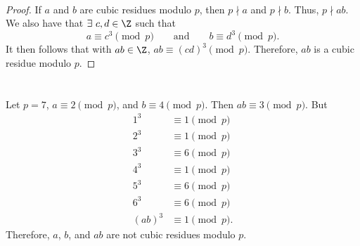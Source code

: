 \documentclass[
  coursecode={MTHE 418},
  assignmentname={Homework \homeworknumber},
  studentnumber=20053722,
  name={Bryan Hoang},z
  draft,
]{
  ltxanswer%
}
\begin{document}
  \begin{questions}
    \setcounter{question}{\questionnumber}
    \addtocounter{question}{-1}
    \question[10]\
    \begin{parts}
      \part{}
      \begin{solution}
        \begin{proof}
          If \(a\) and \(b\) are cubic residues modulo \(p\), then \(p \nmid a\) and \(p \nmid b\). Thus, \(p \nmid ab\). We also have that \(\exists\ c, d \in\Z\) such that
          \begin{equation*}
            a \equiv c^{3} \pmod{p} \qquad \text{and} \qquad b \equiv d^{3} \pmod{p}.
          \end{equation*}
          It then follows that with \(ab \in\Z\), \(ab \equiv (cd)^{3} \pmod{p}\). Therefore, \(ab\) is a cubic residue modulo \(p\).
        \end{proof}
      \end{solution}

      \part{}
      \begin{solution}
        \begin{example}
          Let \(p = 7\), \(a \equiv 2 \pmod{p}\), and \(b \equiv 4 \pmod{p}\). Then \(ab \equiv 3 \pmod{p}\). But
          \begin{align*}
            1^{3}    &\equiv 1 \pmod{p}  \\
            2^{3}    &\equiv 1 \pmod{p}  \\
            3^{3}    &\equiv 6 \pmod{p}  \\
            4^{3}    &\equiv 1 \pmod{p}  \\
            5^{3}    &\equiv 6 \pmod{p}  \\
            6^{3}    &\equiv 6 \pmod{p}  \\
            (ab)^{3} &\equiv 1 \pmod{p}.
          \end{align*}
          Therefore, \(a\), \(b\), and \(ab\) are not cubic residues modulo \(p\).
        \end{example}
      \end{solution}


\end{parts}
\end{questions}
\end{document}
